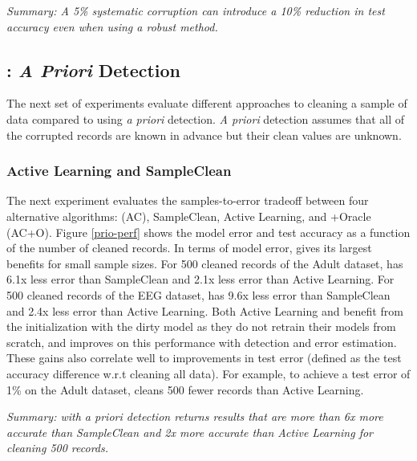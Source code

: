 \noindent \emph{Summary: A 5\% systematic corruption can introduce a 10\% reduction in test accuracy even when using a robust method.}

\subsection{\sys: \protect\textit{\large A Priori} Detection}
The next set of experiments evaluate different approaches to cleaning a sample of data compared to \sys using \emph{a priori} detection.
\emph{A priori} detection assumes that all of the corrupted records are known in advance but their clean values are unknown. 

\subsubsection{Active Learning and SampleClean}
The next experiment evaluates the samples-to-error tradeoff between four alternative algorithms: \sys (AC), SampleClean, Active Learning, and \sys+Oracle (AC+O).
Figure \ref{prio-perf} shows the model error and test accuracy as a function of the number of cleaned records.
In terms of model error, \sys gives its largest benefits for small sample sizes.
For 500 cleaned records of the Adult dataset, \sys has 6.1x less error than SampleClean and 2.1x less error than Active Learning.
For 500 cleaned records of the EEG dataset, \sys has 9.6x less error than SampleClean and 2.4x less error than Active Learning.
Both Active Learning and \sys benefit from the initialization with the dirty model as they do not retrain their models from scratch, and \sys improves on this performance with detection and error estimation.
These gains also correlate well to improvements in test error (defined as the test accuracy difference w.r.t cleaning all data).
For example, to achieve a test error of 1\% on the Adult dataset, \sys cleans 500 fewer records than Active Learning.


\vspace{0.25em}

\noindent \emph{Summary: \sys with a priori detection returns results that are more than 6x more accurate than SampleClean and 2x more accurate than Active Learning for cleaning 500 records.}

